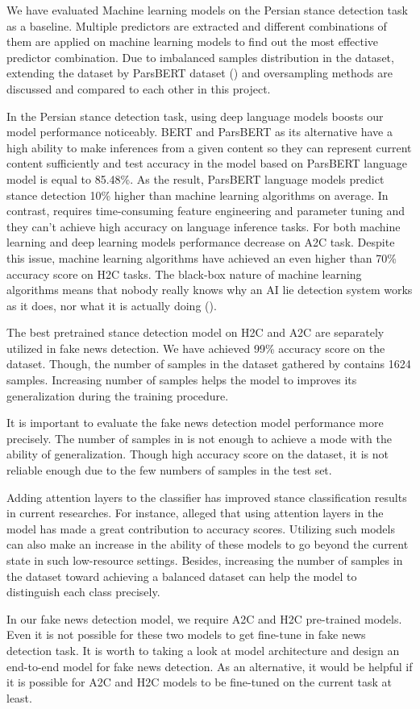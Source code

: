 We have evaluated Machine learning models on the Persian stance detection task as a baseline. Multiple predictors are extracted and different combinations of them are applied on machine learning models to find out the most effective predictor combination. Due to imbalanced samples distribution in the \cite{stance_persian} dataset, extending the dataset by \ac{ParsBERT} dataset (\cite{parsbert}) and oversampling methods are discussed and compared to each other in this project.

In the Persian stance detection task, using deep language models boosts our model performance noticeably. \ac{BERT} and \ac{ParsBERT} as its alternative have a high ability to make inferences from a given content so they can represent current content sufficiently and test accuracy in the model based on \ac{ParsBERT} language model is equal to 85.48\%. As the result,  \ac{ParsBERT} language models predict stance detection 10\% higher than machine learning algorithms on average. In contrast, requires time-consuming feature engineering and parameter tuning and they can't achieve high accuracy on language inference tasks. For both machine learning and deep learning models performance decrease on \ac{A2C} task. Despite this issue, machine learning algorithms have achieved an even higher than 70\% accuracy score on \ac{H2C} tasks. The black-box nature of machine learning algorithms means that nobody really knows why an AI lie detection system works as it does, nor what it is actually doing (\cite{book_fake}). 

The best pretrained stance detection model on \ac{H2C} and \ac{A2C} are separately utilized in fake news detection. We have achieved 99\% accuracy score on the \cite{stance_persian} dataset. Though, the number of samples in the dataset gathered by \cite{stance_persian} contains 1624 samples. Increasing number of samples helps the model to improves its generalization during the training procedure.

It is important to evaluate the fake news detection model performance more precisely. The number of samples in \cite{stance_persian} is not enough to achieve a mode with the ability of generalization. Though high accuracy score on the dataset, it is not reliable enough due to the few numbers of samples in the test set.

Adding attention layers to the classifier has improved stance classification results in current researches. For instance, \cite{book_disinformation} alleged that using attention layers in the model has made a great contribution to accuracy scores. Utilizing such models can also make an increase in the ability of these models to go beyond the current state in such low-resource settings. Besides, increasing the number of samples in the \cite{stance_persian} dataset toward achieving a balanced dataset can help the model to distinguish each class precisely. 

In our fake news detection model, we require A2C and H2C pre-trained models. Even it is not possible for these two models to get fine-tune in fake news detection task. It is worth to taking a look at model architecture and design an end-to-end model for fake news detection. As an alternative, it would be helpful if it is possible for A2C and H2C models to be fine-tuned on the current task at least.